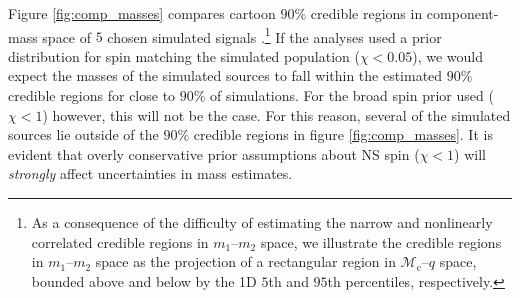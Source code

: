 Figure \ref{fig:comp_masses} compares cartoon $90\%$ credible regions in component-mass space of $5$ chosen simulated signals \citep[cf.][figure 1]{Chatziioannou_2014}.\footnote{As a consequence of the difficulty of estimating the narrow and nonlinearly correlated credible regions in $m_1$--$m_2$ space, we illustrate the credible regions in $m_1$--$m_2$ space as the projection of a rectangular region in $\mathcal{M}_\mathrm{c}$--$q$ space, bounded above and below by the 1D $5$th and $95$th percentiles, respectively.} If the analyses used a prior distribution for spin matching the simulated population ($\chi < 0.05$), we would expect the masses of the simulated sources to fall within the estimated $90\%$ credible regions for close to $90\%$ of simulations. For the broad spin prior used ($\chi < 1$) however, this will not be the case.  For this reason, several of the simulated sources lie outside of the $90\%$ credible regions in figure \ref{fig:comp_masses}.  It is evident that overly conservative prior assumptions about NS spin ($\chi < 1$) will \textit{strongly} affect uncertainties in mass estimates.
  
  
  
  
  
  
  